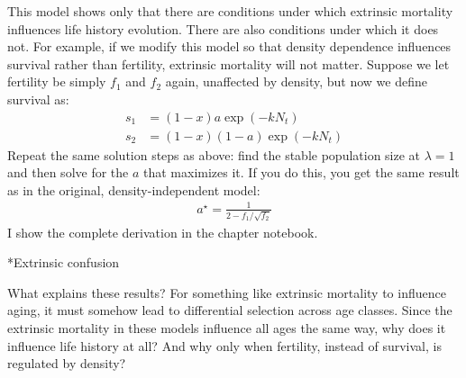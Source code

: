 \documentclass[10pt,reqno]{amsbook}
\makeatletter
\renewcommand\section{\@startsection{section}{1}
\z@{.7\linespacing\@plus\linespacing}{.5\linespacing}
{\large\bfseries\itshape}}
\numberwithin{equation}{chapter}
\makeatother
\begin{document}
This model shows only that there are conditions under which extrinsic mortality influences life history evolution. There are also conditions under which it does not. For example, if we modify this model so that density dependence influences survival rather than fertility, extrinsic mortality will not matter. Suppose we let fertility be simply $f_1$ and $f_2$ again, unaffected by density, but now we define survival as:
\begin{align*}
	s_1 &= (1-x)a \exp(-kN_t) \\
	s_2 &= (1-x)(1-a) \exp(-kN_t)
\end{align*}
Repeat the same solution steps as above: find the stable population size at $\lambda=1$ and then solve for the $a$ that maximizes it. If you do this, you get the same result as in the original, density-independent model:
\begin{align*}
	a^{\!\star} = \frac{1}{2 - f_1 / \! \sqrt{f_2}}
\end{align*}
I show the complete derivation in the chapter notebook. 


\section*{Extrinsic confusion}

What explains these results? For something like extrinsic mortality to influence aging, it must somehow lead to differential selection across age classes. Since the extrinsic mortality in these models influence all ages the same way, why does it influence life history at all? And why only when fertility, instead of survival, is regulated by density? 
\end{document}
